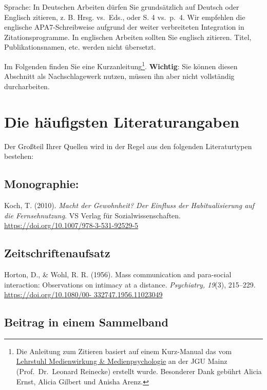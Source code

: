 \documentclass[
  letterpaper,
  DIV=11]{scrreprt}
\begin{document}
Sprache: In Deutschen Arbeiten dürfen Sie grundsätzlich auf Deutsch oder
Englisch zitieren, z. B. Hrsg. vs.~Eds., oder S. 4 vs.~p.~4. Wir
empfehlen die englische APA7-Schreibweise aufgrund der weiter
verbreiteten Integration in Zitationsprogramme. In englischen Arbeiten
sollten Sie englisch zitieren. Titel, Publikationsnamen, etc. werden
nicht übersetzt.

Im Folgenden finden Sie eine Kurzanleitung\footnote{Die Anleitung zum
  Zitieren basiert auf einem Kurz-Manual das vom
  \href{https://www.medienpsychologie.ifp.uni-mainz.de/}{Lehrstuhl
  Medienwirkung \& Medienpsychologie} an der JGU Mainz
  (Prof.~Dr.~Leonard Reinecke) erstellt wurde. Besonderer Dank gebührt
  Alicia Ernst, Alicia Gilbert und Anisha Arenz.}. \textbf{Wichtig}: Sie
können diesen Abschnitt als Nachschlagewerk nutzen, müssen ihn aber
nicht vollständig durcharbeiten.

\hypertarget{die-huxe4ufigsten-literaturangaben}{%
\section{Die häufigsten
Literaturangaben}\label{die-huxe4ufigsten-literaturangaben}}

Der Großteil Ihrer Quellen wird in der Regel aus den folgenden
Literaturtypen bestehen:

\hypertarget{monographie}{%
\subsection{Monographie:}\label{monographie}}

Koch, T. (2010). \emph{Macht der Gewohnheit? Der Einfluss der
Habitualisierung auf die Fernsehnutzung}. VS Verlag für
Sozialwissenschaften. \url{https://doi.org/10.1007/978-3-531-92529-5}

\hypertarget{zeitschriftenaufsatz}{%
\subsection{Zeitschriftenaufsatz}\label{zeitschriftenaufsatz}}

Horton, D., \& Wohl, R. R. (1956). Mass communication and para-social
interaction: Observations on intimacy at a distance. \emph{Psychiatry,
19}(3), 215--229.
\href{https://doi.org/10.1080/00-\%20332747.1956.11023049}{https://doi.org/10.1080/00-
332747.1956.11023049}

\hypertarget{beitrag-in-einem-sammelband}{%
\subsection{Beitrag in einem
Sammelband}\label{beitrag-in-einem-sammelband}}
\end{document}
